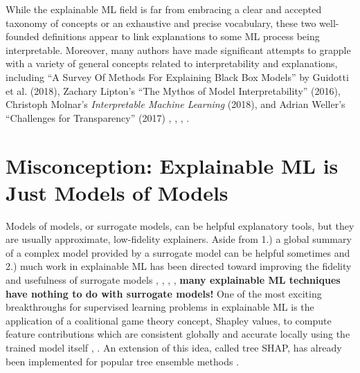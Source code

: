 \documentclass[fleqn]{article}
\begin{document}
While the explainable ML field is far from embracing a clear and accepted taxonomy of concepts or an exhaustive and precise vocabulary, these two well-founded definitions appear to link explanations to some ML process being interpretable. Moreover, many authors have made significant attempts to grapple with a variety of general concepts related to interpretability and explanations, including ``A Survey Of Methods For Explaining Black Box Models'' by Guidotti et al. (2018), Zachary Lipton's ``The Mythos of Model Interpretability'' (2016), Christoph Molnar's \textit{Interpretable Machine Learning} (2018), and Adrian Weller's ``Challenges for Transparency'' (2017) \cite{guidotti2018survey},  \cite{lipton1}, \cite{molnar}, \cite{weller2017challenges}. 

\section{Misconception: Explainable ML is Just Models of Models}

Models of models, or surrogate models, can be helpful explanatory tools, but they are usually approximate, low-fidelity explainers. Aside from 1.) a global summary of a complex model provided by a surrogate model can be helpful sometimes and 2.) much work in explainable ML has been directed toward improving the fidelity and usefulness of surrogate models \cite{dt_surrogate1}, \cite{dt_surrogate2}, \cite{lime-sup}, \cite{wf_xnn}, \textbf{many explainable ML techniques have nothing to do with surrogate models!} One of the most exciting breakthroughs for supervised learning problems in explainable ML is the application of a coalitional game theory concept, Shapley values, to compute feature contributions which are consistent globally and accurate locally using the trained model itself \cite{kononenko2010efficient}, \cite{shapley}. An extension of this idea, called tree SHAP, has already been implemented for popular tree ensemble methods \cite{tree_shap}. 
\end{document}
